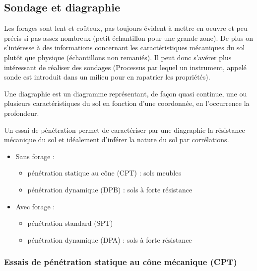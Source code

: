         \subsection{Sondage et diagraphie}
            
            Les forages sont lent et coûteux, pas toujours évident à mettre en oeuvre et peu précis si pas assez nombreux (petit échantillon pour une grande zone). De plus on s'intéresse à des informations concernant les caractéristiques mécaniques du sol plutôt que physique (échantillons non remaniés). Il peut donc s'avérer plus intéressant de réaliser des sondages (Processus par lequel un instrument, appelé 
            sonde est introduit dans un milieu pour en rapatrier les propriétés). 
            
            Une diagraphie est un diagramme représentant, de façon quasi continue, une ou plusieurs caractéristiques du sol en fonction d'une coordonnée, en l'occurrence la profondeur. 
            
            Un essai de pénétration permet de caractériser par une diagraphie la résistance mécanique du sol et idéalement d'inférer la nature du sol par corrélations.
            
            \begin{itemize}
                \item Sans forage :
                \begin{itemize}
                    \item pénétration statique au cône (CPT) : sols meubles
                    \item pénétration dynamique (DPB) : sols à forte résistance
                \end{itemize}
                
                \item Avec forage :
                \begin{itemize}
                    \item pénétration standard (SPT)
                    \item pénétration dynamique (DPA) : sols à forte résistance
                \end{itemize}
            \end{itemize}
            
        \subsubsection{Essais de pénétration statique au cône mécanique (CPT)}
            
